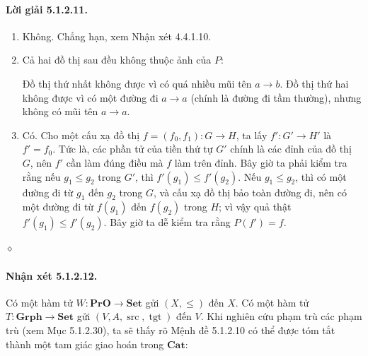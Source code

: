 \paragraph{Lời giải 5.1.2.11.}
\begin{enumerate}[label=\alph*.]
\item Không. Chẳng hạn, xem Nhận xét 4.4.1.10.
\item Cả hai đồ thị sau đều không thuộc ảnh của $P$:
\begin{center}\end{center}
Đồ thị thứ nhất không được vì có quá nhiều mũi tên $a\to b$. Đồ thị thứ hai không được vì có một đường đi $a\to a$ (chính là đường đi tầm thường), nhưng không có mũi tên $a\to a$.
\item Có. Cho một cấu xạ đồ thị $f=(f_0,f_1):G\to H$, ta lấy $f':G'\to H'$ là $f'=f_0$. Tức là, các phần tử của tiền thứ tự $G'$ chính là các đỉnh của đồ thị $G$, nên $f'$ cần làm đúng điều mà $f$ làm trên đỉnh. Bây giờ ta phải kiểm tra rằng nếu $g_1\leq g_2$ trong $G'$, thì $f'(g_1)\leq f'(g_2)$. Nếu $g_1\leq g_2$, thì có một đường đi từ $g_1$ đến $g_2$ trong $G$, và cấu xạ đồ thị bảo toàn đường đi, nên có một đường đi từ $f(g_1)$ đến $f(g_2)$ trong $H$; vì vậy quả thật $f'(g_1)\leq f'(g_2)$. Bây giờ ta dễ kiểm tra rằng $P(f')=f$.
\end{enumerate}\hfill$\diamond$
\paragraph{Nhận xét 5.1.2.12.} Có một hàm tử $W:\mathbf{PrO}\to\mathbf{Set}$ gửi $(X,\leq)$ đến $X$. Có một hàm tử $T:\mathbf{Grph}\to\mathbf{Set}$ gửi $(V,A,\operatorname{src},\operatorname{tgt})$ đến $V$. Khi nghiên cứu phạm trù các phạm trù (xem Mục 5.1.2.30), ta sẽ thấy rõ Mệnh đề 5.1.2.10 có thể được tóm tắt thành một tam giác giao hoán trong $\mathbf{Cat}$:
\begin{center}\end{center}
